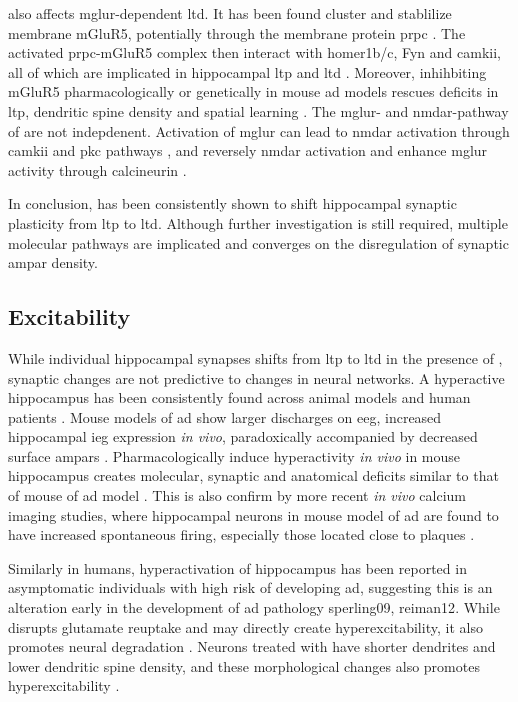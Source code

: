\abeta also affects \gls{mglur}-dependent \gls{ltd}. It has been found \abeta cluster and stablilize membrane mGluR5, potentially through the membrane protein \gls{prpc} \citep{renner10, um13}. The activated \gls{prpc}-mGluR5 complex then interact with homer1b/c, Fyn and \gls{camkii}, all of which are implicated in hippocampal \gls{ltp} and \gls{ltd} \citep{raka15, haas16}. Moreover, inhihbiting mGluR5 pharmacologically or genetically in mouse \gls{ad} models rescues deficits in \gls{ltp}, dendritic spine density and spatial learning \citep{rammes11, hu14, um13, hamilton14}. The \gls{mglur}- and \gls{nmdar}-pathway of \abeta are not indepdenent. Activation of \gls{mglur} can lead to \gls{nmdar} activation through \gls{camkii} and \gls{pkc} pathways \citep{chen11, jin15}, and reversely \gls{nmdar} activation and enhance \gls{mglur} activity through calcineurin \citep{alagarsamy99, alagarsamy05}. 

In conclusion, \abeta has been consistently shown to shift hippocampal synaptic plasticity from \gls{ltp} to \gls{ltd}. Although further investigation is still required, multiple molecular pathways are implicated and converges on the disregulation of synaptic \gls{ampar} density. 


\subsection{Excitability}

While individual hippocampal synapses shifts from \gls{ltp} to \gls{ltd} in the presence of \abeta, synaptic changes are not predictive to changes in neural networks. A hyperactive hippocampus has been consistently found across animal models and human patients \citep{palop16}. Mouse models of \gls{ad} show larger discharges on \gls{eeg}, increased hippocampal \gls{ieg} expression \textit{in vivo}, paradoxically accompanied by decreased surface \glspl{ampar} \citep{palop07, harris10, born14}. Pharmacologically induce hyperactivity \textit{in vivo} in mouse hippocampus creates molecular, synaptic and anatomical deficits similar to that of mouse of \gls{ad} model \citep{palop07}. This is also confirm by more recent \textit{in vivo} calcium imaging studies, where hippocampal neurons in mouse model of \gls{ad} are found to have increased spontaneous firing, especially those located close to plaques \citep{busche12}. 

Similarly in humans, hyperactivation of hippocampus has been reported in asymptomatic individuals with high risk of developing \gls{ad}, suggesting this is an alteration early in the development of \gls{ad} pathology {sperling09, reiman12}. While \abeta disrupts glutamate reuptake and may directly create hyperexcitability, it also promotes neural degradation \citep{spires04, koffie09}. Neurons treated with \abeta have shorter dendrites and lower dendritic spine density, and these morphological changes also promotes hyperexcitability \citep{siskova14}.

